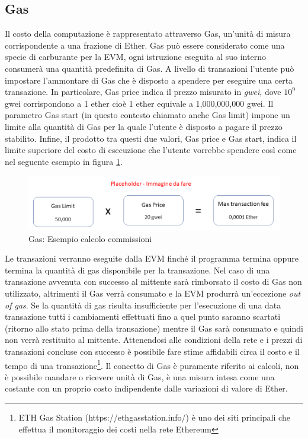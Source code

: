 \subsection{Gas}

Il costo della computazione è rappresentato attraverso Gas, un’unità di misura corrispondente a una frazione di Ether. Gas può essere considerato come una specie di carburante per la EVM, ogni istruzione eseguita al suo interno consumerà una quantità predefinita di Gas. A livello di transazioni l’utente può impostare l’ammontare di Gas che è disposto a spendere per eseguire una certa transazione. In particolare, Gas price indica il prezzo misurato in \emph{gwei}, dove \(10^{9}\) gwei corrispondono a 1 ether cioè 1 ether equivale a 1,000,000,000 gwei. Il parametro Gas start (in questo contesto chiamato anche Gas limit) impone un limite alla quantità di Gas per la quale l’utente è disposto a pagare il prezzo stabilito.
Infine, il prodotto tra questi due valori, Gas price e Gas start, indica il limite superiore del costo di esecuzione che l’utente vorrebbe spendere così come nel seguente esempio in figura \ref{fig:GasEth}.

\begin{figure}[H]
\centering
\includegraphics[width=1\textwidth]{immagini/gas.png}
\caption{Gas: Esempio calcolo commissioni}
\label{fig:GasEth}
\end{figure}

Le transazioni verranno eseguite dalla EVM finché il programma termina oppure termina la quantità di gas disponibile per la transazione. Nel caso di una transazione avvenuta con successo al mittente sarà rimborsato il costo di Gas non utilizzato, altrimenti il Gas verrà consumato e la EVM produrrà un'eccezione \emph{out of gas}. Se la quantità di gas risulta insufficiente per l'esecuzione di una data transazione tutti i cambiamenti effettuati fino a quel punto saranno scartati (ritorno allo stato prima della transazione) mentre il Gas sarà consumato e quindi non verrà restituito al mittente.
Attenendosi alle condizioni della rete e i prezzi di transazioni concluse con successo è possibile fare stime affidabili circa il costo e il tempo di una transazione\footnote{ETH Gas Station (https://ethgasstation.info/) è uno dei siti principali che effettua il monitoraggio dei costi nella rete Ethereum}. Il concetto di Gas è puramente riferito ai calcoli, non è possibile mandare o ricevere unità di Gas, è una misura intesa come una costante con un proprio costo indipendente dalle variazioni di valore di Ether.

